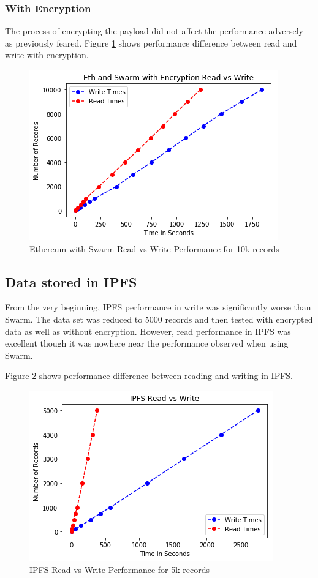 \documentclass[11pt,openright]{report}
\begin{document}
\subsubsection{With Encryption}
The process of encrypting the payload did not affect the performance adversely as previously feared. Figure \ref{fig:graph_eth_swarm_encr_readvwrite} shows performance difference between read and write with encryption.

\begin{figure}
    \centering
    \includegraphics[scale=1]{results/graphs/Eth_Swarm_Read_v_Write_Encr.png}
    \caption{Ethereum with Swarm Read vs Write Performance for 10k records}
    \label{fig:graph_eth_swarm_encr_readvwrite}
\end{figure}

\subsection{Data stored in IPFS}
From the very beginning, IPFS performance in write was significantly worse than Swarm. The data set was reduced to 5000 records and then tested with encrypted data as well as without encryption. However, read performance in IPFS was excellent though it was nowhere near the performance observed when using Swarm.

Figure \ref{fig:graph_ipfs_readvwrite} shows performance difference between reading and writing in IPFS.
\begin{figure}
    \centering
    \includegraphics[scale=1]{results/graphs/IPFS_Read_v_Write.png}
    \caption{IPFS Read vs Write Performance for 5k records}
    \label{fig:graph_ipfs_readvwrite}
\end{figure}
\end{document}
